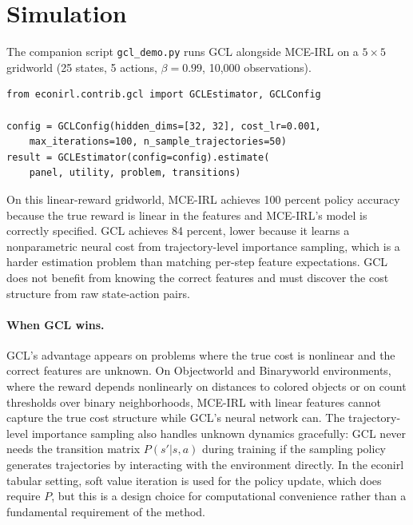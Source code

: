 \documentclass[11pt]{article}
\begin{document}
\section{Simulation}

The companion script \texttt{gcl\_demo.py} runs GCL alongside MCE-IRL on a $5 \times 5$ gridworld (25 states, 5 actions, $\beta = 0.99$, 10{,}000 observations).

\begin{lstlisting}[basicstyle=\footnotesize\ttfamily]
from econirl.contrib.gcl import GCLEstimator, GCLConfig

config = GCLConfig(hidden_dims=[32, 32], cost_lr=0.001,
    max_iterations=100, n_sample_trajectories=50)
result = GCLEstimator(config=config).estimate(
    panel, utility, problem, transitions)
\end{lstlisting}

\begin{table}[H]
\centering
\caption{GCL vs MCE-IRL on $5 \times 5$ gridworld ($\beta = 0.99$, 10{,}000 obs).}
\label{tab:gcl_results}

\end{table}

On this linear-reward gridworld, MCE-IRL achieves 100 percent policy accuracy because the true reward is linear in the features and MCE-IRL's model is correctly specified.
GCL achieves 84 percent, lower because it learns a nonparametric neural cost from trajectory-level importance sampling, which is a harder estimation problem than matching per-step feature expectations.
GCL does not benefit from knowing the correct features and must discover the cost structure from raw state-action pairs.

\paragraph{When GCL wins.}
GCL's advantage appears on problems where the true cost is nonlinear and the correct features are unknown.
On Objectworld and Binaryworld environments, where the reward depends nonlinearly on distances to colored objects or on count thresholds over binary neighborhoods, MCE-IRL with linear features cannot capture the true cost structure while GCL's neural network can.
The trajectory-level importance sampling also handles unknown dynamics gracefully: GCL never needs the transition matrix $P(s'|s,a)$ during training if the sampling policy generates trajectories by interacting with the environment directly.
In the econirl tabular setting, soft value iteration is used for the policy update, which does require $P$, but this is a design choice for computational convenience rather than a fundamental requirement of the method.
\end{document}
